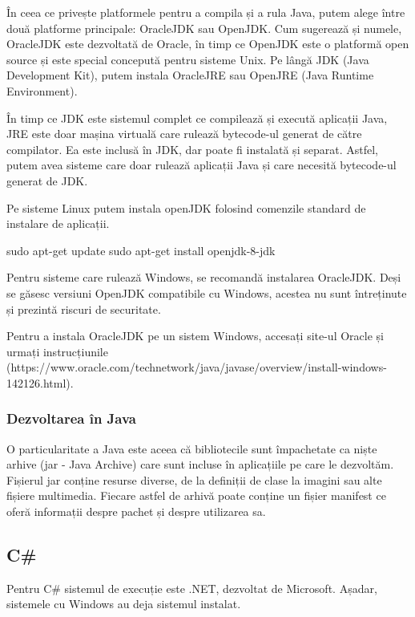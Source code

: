 În ceea ce privește platformele pentru a compila și a rula Java, putem alege
între două platforme principale: OracleJDK sau OpenJDK. Cum sugerează și numele,
OracleJDK este dezvoltată de Oracle, în timp ce OpenJDK este o platformă open
source și este special concepută pentru sisteme Unix. Pe lângă JDK (Java
Development Kit), putem instala OracleJRE sau OpenJRE (Java Runtime
Environment).

În timp ce JDK este sistemul complet ce compilează și execută aplicații Java,
JRE este doar mașina virtuală care rulează bytecode-ul generat de către
compilator. Ea este inclusă în JDK, dar poate fi instalată și separat. Astfel,
putem avea sisteme care doar rulează aplicații Java și care necesită bytecode-ul
generat de JDK.

Pe sisteme Linux putem instala openJDK folosind comenzile standard de instalare
de aplicații.

\begin{screen}
sudo apt-get update
sudo apt-get install openjdk-8-jdk
\end{screen}

Pentru sisteme care rulează Windows, se recomandă instalarea OracleJDK. Deși se
găsesc versiuni OpenJDK compatibile cu Windows, acestea nu sunt întreținute și
prezintă riscuri de securitate.

Pentru a instala OracleJDK pe un sistem Windows, accesați site-ul Oracle și
urmați instrucțiunile
(https://www.oracle.com/technetwork/java/javase/overview/install-windows-142126.html).

\subsubsection{Dezvoltarea în Java}
\label{sec:appdev-ideinstall-java-dev}

O particularitate a Java este aceea că bibliotecile sunt împachetate ca niște
arhive (jar - Java Archive) care sunt incluse în aplicațiile pe care le
dezvoltăm. Fișierul jar conține resurse diverse, de la definiții de clase la
imagini sau alte fișiere multimedia. Fiecare astfel de arhivă poate conține un
fișier manifest ce oferă informații despre pachet și despre utilizarea sa.


\subsection{C\#}
\label{sec:appdev-ideinstall-cs}

Pentru C\# sistemul de execuție este .NET, dezvoltat de Microsoft. Așadar,
sistemele cu Windows au deja sistemul instalat.

